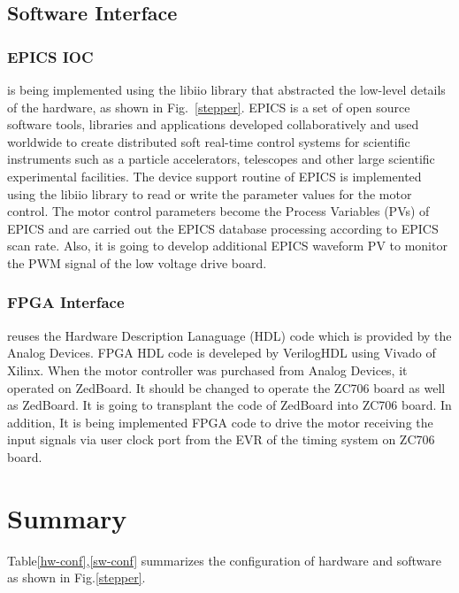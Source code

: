 \documentclass[a4paper,
              ]{jacow}
\begin{document}
\subsection{Software Interface}

\subsubsection{EPICS IOC} 
is being implemented using the libiio library that abstracted the low-level details of the hardware, as shown in Fig.~\ref{stepper}. EPICS is a set of open source software tools, libraries and applications developed collaboratively and used worldwide to create distributed soft real-time control systems for scientific instruments such as a particle accelerators, telescopes and other large scientific experimental facilities\cite{epics}.
The device support routine of EPICS is implemented using the libiio library to read or write the parameter values for the motor control. The motor control parameters become the Process Variables (PVs) of EPICS and are carried out the EPICS database processing according to EPICS scan rate. Also, it is going to develop additional EPICS waveform PV to monitor the PWM signal of the low voltage drive board.

\subsubsection{FPGA Interface}
reuses the Hardware Description Lanaguage (HDL) code which is provided by the Analog Devices. FPGA HDL code is develeped by VerilogHDL using Vivado of Xilinx. When the motor controller was purchased from Analog Devices, it operated on ZedBoard. It should be changed to operate the ZC706 board as well as ZedBoard. It is going to transplant the code of ZedBoard into ZC706 board. In addition, It is being implemented FPGA code to drive the motor receiving the input signals via user clock port from the EVR of the timing system on ZC706 board.


\section{Summary}

Table\ref{hw-conf},\ref{sw-conf} summarizes the configuration of hardware and software as shown in Fig.\ref{stepper}.
\end{document}
